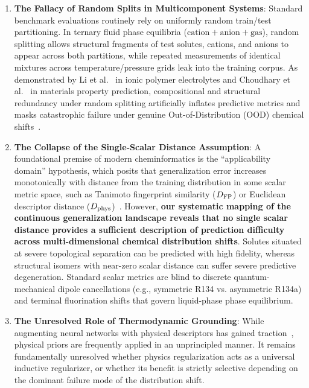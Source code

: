 \begin{enumerate}
    \item \textbf{The Fallacy of Random Splits in Multicomponent Systems}: Standard benchmark evaluations routinely rely on uniformly random train/test partitioning. In ternary fluid phase equilibria ($\text{cation} + \text{anion} + \text{gas}$), random splitting allows structural fragments of test solutes, cations, and anions to appear across both partitions, while repeated measurements of identical mixtures across temperature/pressure grids leak into the training corpus. As demonstrated by Li et al.~\cite{Li2023_NatCommun} in ionic polymer electrolytes and Choudhary et al.~\cite{Choudhary2024_OODBenchmark} in materials property prediction, compositional and structural redundancy under random splitting artificially inflates predictive metrics and masks catastrophic failure under genuine Out-of-Distribution (OOD) chemical shifts~\cite{Wu2018_MoleculeNet}.
    
    \item \textbf{The Collapse of the Single-Scalar Distance Assumption}: A foundational premise of modern cheminformatics is the ``applicability domain'' hypothesis, which posits that generalization error increases monotonically with distance from the training distribution in some scalar metric space, such as Tanimoto fingerprint similarity ($D_{\rm FP}$) or Euclidean descriptor distance ($D_{\rm phys}$)~\cite{Tropsha2003_QsarValidation,Netzeva2005_ApplicabilityDomain}. However, \textbf{our systematic mapping of the continuous generalization landscape reveals that no single scalar distance provides a sufficient description of prediction difficulty across multi-dimensional chemical distribution shifts}. Solutes situated at severe topological separation can be predicted with high fidelity, whereas structural isomers with near-zero scalar distance can suffer severe predictive degeneration. Standard scalar metrics are blind to discrete quantum-mechanical dipole cancellations (e.g., symmetric R134 vs. asymmetric R134a) and terminal fluorination shifts that govern liquid-phase phase equilibrium.
    
    \item \textbf{The Unresolved Role of Thermodynamic Grounding}: While augmenting neural networks with physical descriptors has gained traction~\cite{Karpatne2017_PGML,Karniadakis2021_PINN_Review}, physical priors are frequently applied in an unprincipled manner. It remains fundamentally unresolved whether physics regularization acts as a universal inductive regularizer, or whether its benefit is strictly selective depending on the dominant failure mode of the distribution shift.
    

\end{enumerate}
